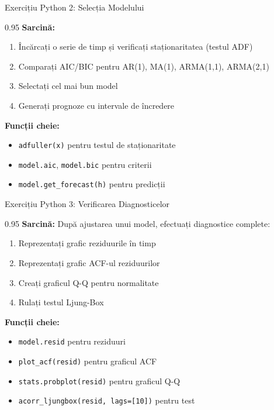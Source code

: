 \documentclass[9pt, aspectratio=169, t]{beamer}
\begin{document}
\begin{frame}{Exercițiu Python 2: Selecția Modelului}
    \begin{cminipage}{0.95\textwidth}
    \textbf{Sarcină:}
    \begin{enumerate}\setlength{\itemsep}{0pt}
        \item Încărcați o serie de timp și verificați staționaritatea (testul ADF)
        \item Comparați AIC/BIC pentru AR(1), MA(1), ARMA(1,1), ARMA(2,1)
        \item Selectați cel mai bun model
        \item Generați prognoze cu intervale de încredere
    \end{enumerate}

    \vspace{0.3cm}
    \textbf{Funcții cheie:}
    \begin{itemize}\setlength{\itemsep}{0pt}
        \item \texttt{adfuller(x)} pentru testul de staționaritate
        \item \texttt{model.aic}, \texttt{model.bic} pentru criterii
        \item \texttt{model.get\_forecast(h)} pentru predicții
    \end{itemize}
    \end{cminipage}
\end{frame}

\begin{frame}{Exercițiu Python 3: Verificarea Diagnosticelor}
    \begin{cminipage}{0.95\textwidth}
    \textbf{Sarcină:} După ajustarea unui model, efectuați diagnostice complete:
    \begin{enumerate}\setlength{\itemsep}{0pt}
        \item Reprezentați grafic reziduurile în timp
        \item Reprezentați grafic ACF-ul reziduurilor
        \item Creați graficul Q-Q pentru normalitate
        \item Rulați testul Ljung-Box
    \end{enumerate}

    \vspace{0.3cm}
    \textbf{Funcții cheie:}
    \begin{itemize}\setlength{\itemsep}{0pt}
        \item \texttt{model.resid} pentru reziduuri
        \item \texttt{plot\_acf(resid)} pentru graficul ACF
        \item \texttt{stats.probplot(resid)} pentru graficul Q-Q
        \item \texttt{acorr\_ljungbox(resid, lags=[10])} pentru test
    \end{itemize}
    \end{cminipage}
\end{frame}
\end{document}
